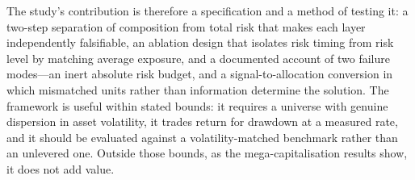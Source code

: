 The study's contribution is therefore a specification and a method of testing it: a
two-step separation of composition from total risk that makes each layer independently
falsifiable, an ablation design that isolates risk timing from risk level by matching
average exposure, and a documented account of two failure modes---an inert absolute risk
budget, and a signal-to-allocation conversion in which mismatched units rather than
information determine the solution. The framework is useful within stated bounds: it
requires a universe with genuine dispersion in asset volatility, it trades return for
drawdown at a measured rate, and it should be evaluated against a volatility-matched
benchmark rather than an unlevered one. Outside those bounds, as the mega-capitalisation
results show, it does not add value.

